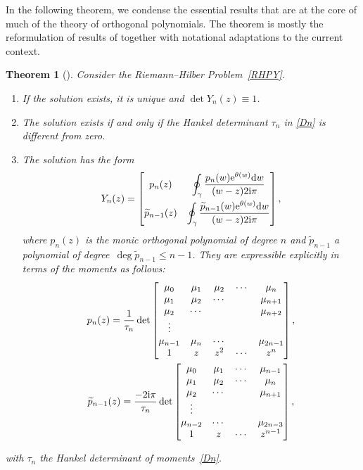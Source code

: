 \documentclass[pdftex]{sigma}
\numberwithin{equation}{section}
\newtheorem{Theorem}{Theorem}[section]
\theoremstyle{definition}
\def \wt{ \widetilde }
\def \d{{\mathrm d}}
\def\be{\begin{equation}}
\def\ee{\end{equation}}
\begin{document}
In the following theorem, we condense the essential results that are at the core of much of the theory of orthogonal polynomials. The theorem is mostly the reformulation of results of \cite{FIK} together with notational adaptations to the current context.
\begin{Theorem}[\cite{FIK}]
\label{thmY}
Consider the Riemann--Hilber Problem~{\rm\ref{RHPY}}.
\begin{enumerate}
\item[$(1)$]
If the solution exists, it is unique and $\det Y_n(z) \equiv 1$.
\item[$(2)$] The solution exists if and only if the Hankel determinant $\tau_n$ in \eqref{Dn} is different from zero.
\item[$(3)$] The solution has the form
\be
\label{Ynsol}
Y_n(z) = \begin{bmatrix}
p_n(z) & \displaystyle \oint_{\gamma} \frac {p_n(w) {\rm e}^{\theta(w)} \d w}{(w-z)2{\rm i}\pi}
\vspace{1mm}\\
\wt p_{n-1}(z) & \displaystyle \oint_{\gamma} \frac {\wt p_{n-1}(w) {\rm e}^{\theta(w)} \d w}{(w-z)2{\rm i}\pi}
\end{bmatrix},
\ee
where $p_n(z)$ is the monic orthogonal polynomial of degree $n$ and $\wt p_{n-1}$ a polynomial of degree~${\deg \wt p_{n-1} \leq n-1}$. They are expressible explicitly in terms of the moments as follows:
\begin{gather}
p_n(z) = \frac 1{\tau_n} \det \begin{bmatrix}
\mu_0 &\mu_1 &\mu_2 &\cdots & \mu_n\\
\mu_1 &\mu_2 & \cdots &&\mu_{n+1}\\
\mu_2 & \cdots &&&\mu_{n+2}\\
\vdots\\
\mu_{n-1} & \mu_{n} & \cdots & &\mu_{2n-1}\\
1 & z & z^2 & \cdots & z^n
\end{bmatrix},
\label{pn}
\\
\wt p_{n-1}(z) = \frac {-2{\rm i}\pi} {\tau_n} \det \begin{bmatrix}
\mu_0 &\mu_1 &\cdots & \mu_{n-1}\\
\mu_1 &\mu_2 & \cdots &\mu_{n}\\
\mu_2 & \cdots &&\mu_{n+1}\\
\vdots\\
\mu_{n-2} & \cdots & &\mu_{2n-3}\\
1 & z & \cdots & z^{n-1}
\end{bmatrix}
\label{wtpn-1},
\end{gather}
\end{enumerate}
with $\tau_n$ the Hankel determinant of moments~\eqref{Dn}.
\end{Theorem}
\end{document}
